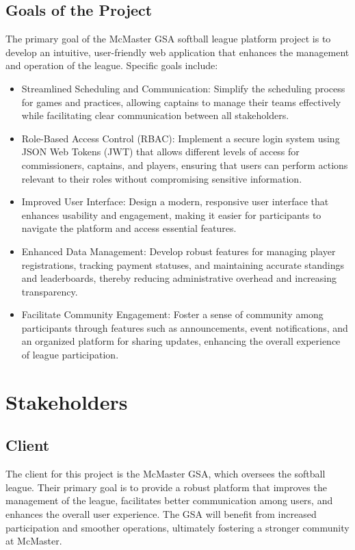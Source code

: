 \documentclass[12pt]{article}
\begin{document}
\subsection{Goals of the Project}
The primary goal of the McMaster GSA softball league platform project is to develop an intuitive, user-friendly web application that enhances the management and operation of the league. Specific goals include:
\begin{itemize}
  \item Streamlined Scheduling and Communication: Simplify the scheduling process for games and practices, allowing captains to manage their teams effectively while facilitating clear communication between all stakeholders.
  \item Role-Based Access Control (RBAC): Implement a secure login system using JSON Web Tokens (JWT) that allows different levels of access for commissioners, captains, and players, ensuring that users can perform actions relevant to their roles without compromising sensitive information.
  \item Improved User Interface: Design a modern, responsive user interface that enhances usability and engagement, making it easier for participants to navigate the platform and access essential features.
  \item Enhanced Data Management: Develop robust features for managing player registrations, tracking payment statuses, and maintaining accurate standings and leaderboards, thereby reducing administrative overhead and increasing transparency.
  \item Facilitate Community Engagement: Foster a sense of community among participants through features such as announcements, event notifications, and an organized platform for sharing updates, enhancing the overall experience of league participation.
\end{itemize}

\pagebreak

\section{Stakeholders}
\subsection{Client}
The client for this project is the McMaster GSA, which oversees the softball league. Their primary goal is to provide a robust platform that improves the management of the league, facilitates better communication among users, and enhances the overall user experience. The GSA will benefit from increased participation and smoother operations, ultimately fostering a stronger community at McMaster.
\end{document}
